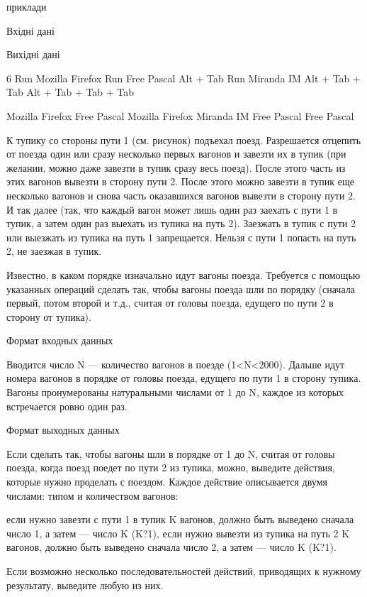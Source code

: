 \documentclass[]{article}
\begin{document}
приклади

Вхідні дані


Вихідні дані

 6
 Run Mozilla Firefox
 Run Free Pascal
 Alt + Tab
 Run Miranda IM
 Alt + Tab + Tab
 Alt + Tab + Tab + Tab



 Mozilla Firefox
 Free Pascal
 Mozilla Firefox
 Miranda IM
 Free Pascal
 Free Pascal 



К тупику со стороны пути 1 (см. рисунок) подъехал поезд. Разрешается отцепить от поезда один или сразу несколько первых вагонов и завезти их в тупик (при желании, можно даже завезти в тупик сразу весь поезд). После этого часть из этих вагонов вывезти в сторону пути 2. После этого можно завезти в тупик еще несколько вагонов и снова часть оказавшихся вагонов вывезти в сторону пути 2. И так далее (так, что каждый вагон может лишь один раз заехать с пути 1 в тупик, а затем один раз выехать из тупика на путь 2). Заезжать в тупик с пути 2 или выезжать из тупика на путь 1 запрещается. Нельзя с пути 1 попасть на путь 2, не заезжая в тупик.

Известно, в каком порядке изначально идут вагоны поезда. Требуется с помощью указанных операций сделать так, чтобы вагоны поезда шли по порядку (сначала первый, потом второй и т.д., считая от головы поезда, едущего по пути 2 в сторону от тупика).

Формат входных данных

Вводится число N — количество вагонов в поезде (1<N<2000). Дальше идут номера вагонов в порядке от головы поезда, едущего по пути 1 в сторону тупика. Вагоны пронумерованы натуральными числами от 1 до N, каждое из которых встречается ровно один раз.

Формат выходных данных

Если сделать так, чтобы вагоны шли в порядке от 1 до N, считая от головы поезда, когда поезд поедет по пути 2 из тупика, можно, выведите действия, которые нужно проделать с поездом. Каждое действие описывается двумя числами: типом и количеством вагонов:

    если нужно завезти с пути 1 в тупик K вагонов, должно быть выведено сначала число 1, а затем — число K (K?1),
    если нужно вывезти из тупика на путь 2 K вагонов, должно быть выведено сначала число 2, а затем — число K (K?1).

Если возможно несколько последовательностей действий, приводящих к нужному результату, выведите любую из них.
\end{document}
